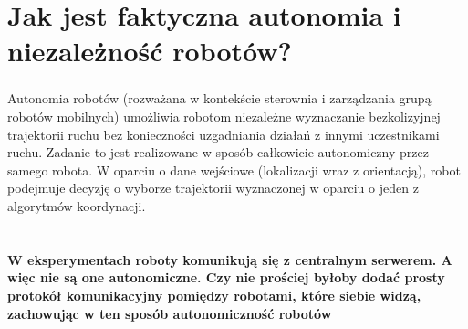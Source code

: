 \section*{Jak jest faktyczna autonomia i niezależność robotów?}
\begin{frame}
\frametitle{\secname}

Autonomia robotów (rozważana w kontekście sterownia i zarządzania grupą robotów mobilnych) umożliwia robotom niezależne wyznaczanie bezkolizyjnej trajektorii ruchu bez konieczności uzgadniania działań z innymi uczestnikami ruchu. Zadanie to jest realizowane w sposób całkowicie autonomiczny przez samego robota.  W oparciu o dane wejściowe (lokalizacji wraz z orientacją), robot podejmuje decyzję o wyborze trajektorii wyznaczonej w oparciu o jeden z algorytmów koordynacji.

\end{frame}



\section*{}
\begin{frame}
\frametitle{\secname}
\begin{center}
	\textbf{W eksperymentach roboty komunikują się z centralnym serwerem. A więc nie są one autonomiczne.  Czy nie prościej byłoby dodać prosty protokół komunikacyjny pomiędzy robotami, które siebie widzą, zachowując w ten sposób autonomiczność robotów}
\end{center}
\end{frame}

